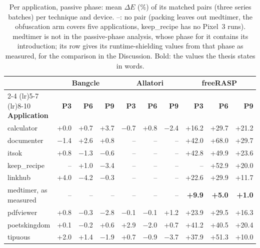 \begin{table}[t]
\centering
\small
\caption{Per application, passive phase: mean $\Delta E$ (\%) of its matched pairs (three series batches) per technique and device. –: no pair (packing leaves out medtimer, the obfuscation arm covers five applications, keep\_recipe has no Pixel~3 runs). medtimer is not in the passive-phase analysis, whose phase for it contains its introduction; its row gives its runtime-shielding values from that phase as measured, for the comparison in the Discussion. Bold: the values the thesis states in words.}
\label{tab:per-app-passive}
\begin{tabular}{lrrrrrrrrr}
\toprule
 & \multicolumn{3}{c}{\textbf{Bangcle}} & \multicolumn{3}{c}{\textbf{Allatori}} & \multicolumn{3}{c}{\textbf{freeRASP}} \\
\cmidrule(lr){2-4} \cmidrule(lr){5-7} \cmidrule(lr){8-10}
\textbf{Application} & \textbf{P3} & \textbf{P6} & \textbf{P9} & \textbf{P3} & \textbf{P6} & \textbf{P9} & \textbf{P3} & \textbf{P6} & \textbf{P9} \\
\midrule
calculator & +0.0 & +0.7 & +3.7 & $-$0.7 & +0.8 & $-$2.4 & +16.2 & +29.7 & +21.2 \\
documenter & $-$1.4 & +2.6 & +0.8 & – & – & – & +42.0 & +68.0 & +29.7 \\
itsok & +0.8 & $-$1.3 & $-$0.6 & – & – & – & +42.8 & +49.9 & +23.6 \\
keep\_recipe & – & +1.0 & $-$3.4 & – & – & – & – & +52.9 & +20.0 \\
linkhub & +4.0 & $-$4.2 & $-$0.3 & – & – & – & +22.6 & +29.9 & +11.7 \\
medtimer, as measured & – & – & – & – & – & – & \textbf{+9.9} & \textbf{+5.0} & \textbf{+1.0} \\
pdfviewer & +0.8 & $-$0.3 & $-$2.8 & $-$0.1 & $-$0.1 & +1.2 & +23.9 & +29.5 & +16.3 \\
poetskingdom & +0.1 & $-$0.2 & +0.6 & +2.9 & $-$2.0 & +0.7 & +41.2 & +40.5 & +20.4 \\
tipuous & +2.0 & +1.4 & $-$1.9 & +0.7 & $-$0.9 & $-$3.7 & +37.9 & +51.3 & +10.0 \\
\bottomrule
\end{tabular}
\end{table}
